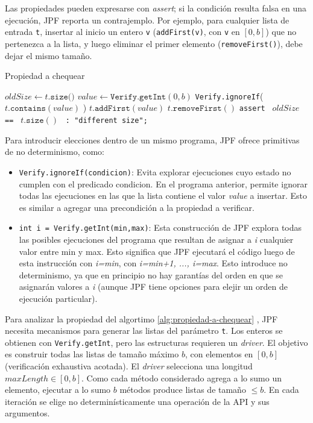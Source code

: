 Las propiedades pueden expresarse con \emph{assert}; si la condición resulta falsa en una ejecución, JPF reporta un
contrajemplo. Por ejemplo, para cualquier lista de entrada \texttt{t}, insertar al inicio un entero \texttt{v} (\texttt{addFirst(v)}, con \texttt{v} en
\([0,b]\)) que no pertenezca a la lista, y luego eliminar el primer elemento (\texttt{removeFirst()}), debe dejar el mismo tamaño.

\begin{algorithm}[H]
  \caption{Propiedad a chequear}
  \label{alg:propiedad-a-chequear}
  $oldSize \gets t.\texttt{size()}$\;
  $value \gets \texttt{Verify.getInt}(0, b)$\;
  \texttt{Verify.ignoreIf}( $t.\texttt{contains}(value)$ )\;
  $t.\texttt{addFirst}(value)$\;
  $t.\texttt{removeFirst}()$\;
  \texttt{assert } $oldSize$ \texttt{ == } $t.\texttt{size}()$
  \texttt{ : "different size";}\;
\end{algorithm}


Para introducir elecciones dentro de un mismo programa, JPF ofrece primitivas de no determinismo, como:
\begin{itemize}
\item \texttt{Verify.ignoreIf(condicion)}: Evita explorar ejecuciones cuyo estado no
cumplen con el predicado condicion. En el programa anterior, permite ignorar todas las ejecuciones en las que la lista contiene el valor \emph{value} a insertar.
Esto es similar a agregar una precondición a la propiedad a verificar.
\item \texttt{int i = Verify.getInt(min,max)}: Esta construcción de JPF explora todas las posibles ejecuciones del programa que resultan de asignar 
a \emph{i} cualquier valor entre min y max. Esto significa que JPF ejecutará el código luego
de esta instrucción con \emph{i=min}, con \emph{i=min+1, ..., i=max}. Esto introduce no
determinismo, ya que en principio no hay garantías del orden en que se
asignarán valores a \emph{i} (aunque JPF tiene opciones para elejir un orden de
ejecución particular). 
\end{itemize}

Para analizar la propiedad del algortimo \ref{alg:propiedad-a-chequear} , JPF necesita mecanismos para generar
las listas del parámetro \texttt{t}. Los enteros se obtienen con
\texttt{Verify.getInt}, pero las estructuras requieren un
\emph{driver}. El objetivo es construir todas las listas de tamaño
máximo \(b\), con elementos en \([0,b]\) (verificación exhaustiva
acotada). El \emph{driver} selecciona una longitud
\(maxLength \in [0,b]\). Como cada método considerado agrega a lo sumo
un elemento, ejecutar a lo sumo \(b\) métodos produce listas de
tamaño \(\le b\). En cada iteración se elige no determinísticamente
una operación de la API y sus argumentos.

